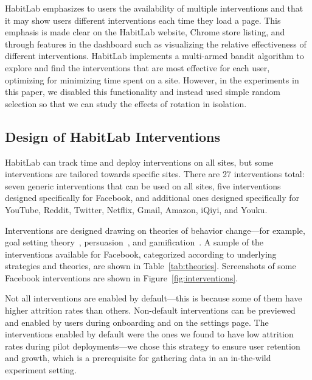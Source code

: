 HabitLab emphasizes to users the availability of multiple interventions and that it may show users different interventions each time they load a page. This emphasis is made clear on the HabitLab website, Chrome store listing, and through features in the dashboard such as visualizing the relative effectiveness of different interventions. HabitLab implements a multi-armed bandit algorithm to explore and find the interventions that are most effective for each user, optimizing for minimizing time spent on a site. However, in the experiments in this paper, we disabled this functionality and instead used simple random selection so that we can study the effects of rotation in isolation.

\subsection{Design of HabitLab Interventions}

HabitLab can track time and deploy interventions on all sites, but some interventions are tailored towards specific sites. There are 27 interventions total: seven generic interventions that can be used on all sites, five interventions designed specifically for Facebook, and additional ones designed specifically for YouTube, Reddit, Twitter, Netflix, Gmail, Amazon, iQiyi, and Youku.

Interventions are designed drawing on theories of behavior change---for example, goal setting theory~\cite{locke2002building}, persuasion~\cite{cialdini1987influence,fogg2002persuasive}, and gamification~\cite{deterding2011game}. A sample of the interventions available for Facebook, categorized according to underlying strategies and theories, are shown in Table~\ref{tab:theories}. Screenshots of some Facebook interventions are shown in Figure~\ref{fig:interventions}. %

Not all interventions are enabled by default---this is because some of them have higher attrition rates than others. Non-default interventions can be previewed and enabled by users during onboarding and on the settings page. The interventions enabled by default were the ones we found to have low attrition rates during pilot deployments---we chose this strategy to ensure user retention and growth, which is a prerequisite for gathering data in an in-the-wild experiment setting.

